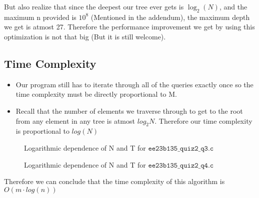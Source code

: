 \documentclass[a4paper]{article}
\begin{document}
But also realize that since the deepest our tree ever gets is $\log _{2} (N)$, and the maximum n provided is $10^8$ (Mentioned in the addendum), the maximum depth we get is atmost 27. Therefore the performance improvement we get by using this optimization is not that big (But it is still welcome).
\subsection{Time Complexity}
\begin{itemize}
    \item Our program still has to iterate through all of the queries exactly once so the time complexity must be directly proportional to M.
    \item Recall that the number of elements we traverse through to get to the root from any element in any tree is atmost $log _{2} N$. Therefore our time complexity is proportional to $log(N)$
\end{itemize}
\begin{figure}[H]
    \centering
    
    \caption{Logarithmic dependence of N and T for $\texttt{ee23b135\_quiz2\_q3.c}$}
\end{figure}
\begin{figure}[H]
    \centering
    
    \caption{Logarithmic dependence of N and T for $\texttt{ee23b135\_quiz2\_q4.c}$}
\end{figure}
Therefore we can conclude that the time complexity of this algorithm is $O(m \cdot log(n))$
\end{document}
